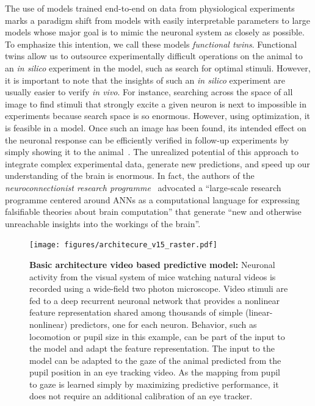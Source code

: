 \documentclass[B2,COG]{ercgrant}
\begin{document}
The use of models trained end-to-end on data from physiological experiments marks a paradigm shift from models with easily interpretable parameters to large models whose major goal is to mimic the neuronal system as closely as possible.
To emphasize this intention, we call these models \textit{functional twins}. 
Functional twins allow us to outsource experimentally difficult operations on the animal to an \textit{in silico} experiment in the model, such as \eg search for optimal stimuli. 
However, it is important to note that the insights of such an \textit{in silico} experiment are usually easier to verify \textit{in vivo}. 
For instance, searching across the space of all image to find stimuli that strongly excite a given neuron is next to impossible in experiments because search space is so enormous.
However, using optimization, it is feasible in a model.
Once such an image has been found, its intended effect on the neuronal response can be efficiently verified in follow-up experiments by simply showing it to the animal~\parencite{Walker2019-yw,Bashivan2019-ry}.
The unrealized potential of this approach to integrate complex experimental data, generate new predictions, and speed up our understanding of the brain is enormous. 
In fact, the authors of the \textit{neuroconnectionist research programme}~\parencite{Doerig2022-ex} advocated a ``large-scale research programme centered around ANNs as a computational language for expressing falsifiable theories about brain computation'' that generate ``new and otherwise unreachable insights into the workings of the brain''. 


\begin{figure}[t]
    \centering
    \texttt{[image: figures/architecure\_v15\_raster.pdf]}
    \caption{\textbf{Basic architecture video based predictive model:} Neuronal activity from the visual system of mice watching natural videos is recorded using a wide-field two photon microscope. Video stimuli are fed to a deep recurrent neuronal network that provides a nonlinear feature representation shared among thousands of simple (linear-nonlinear) predictors, one for each neuron. Behavior, such as locomotion or pupil size in this example, can be part of the input to the model and adapt the feature representation. The input to the model can be adapted to the gaze of the animal predicted from the pupil position in an eye tracking video. As the mapping from pupil to gaze is learned simply by maximizing predictive performance, it does not require an additional calibration of an eye tracker.}    
    \label{fig:videomodel}
\end{figure}
\end{document}
